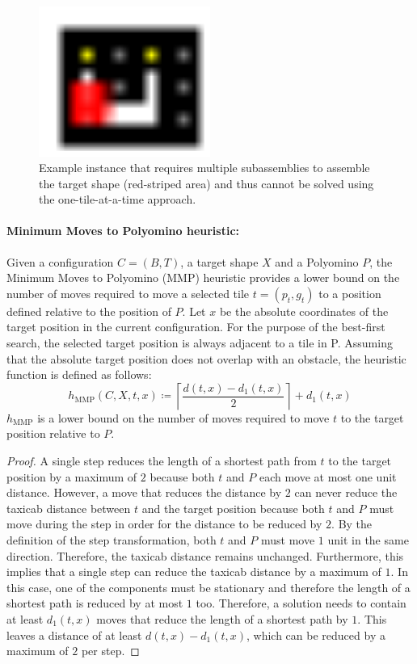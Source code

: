 \begin{figure}
\centering
\includegraphics[width=0.5\textwidth]{figures/subassemblies.pdf}
\caption[Example of necessary subassemblies]{Example instance that requires multiple subassemblies to assemble the target shape (red-striped area) and thus cannot be solved using the one-tile-at-a-time approach.}
\label{fig:subassemblies}
\end{figure}

\paragraph{Minimum Moves to Polyomino heuristic:}
Given a configuration $C = (B, T)$, a target shape $X$ and a Polyomino $P$, the Minimum Moves to Polyomino (MMP) heuristic provides a lower bound on the number of moves required to move a selected tile $t= (p_t, g_t)$ to a position defined relative to the position of $P$. Let $x$ be the absolute coordinates of the target position in the current configuration. For the purpose of the best-first search, the selected target position is always adjacent to a tile in P. Assuming that the absolute target position does not overlap with an obstacle, the heuristic function is defined as follows:
\begin{equation}
h_{\text{MMP}}(C, X, t, x) \coloneqq \left\lceil \dfrac {d(t, x) - d_{1}(t, x)}{2} \right\rceil+ d_{1} (t, x)
\end{equation}
$h_{\text{MMP}}$ is a lower bound on the number of moves required to move $t$ to the target position relative to $P$.

\begin{proof}
A single step reduces the length of a shortest path from $t$ to the target position by a maximum of $2$ because both $t$ and $P$ each move at most one unit distance. However, a move that reduces the distance by $2$ can never reduce the taxicab distance between $t$ and the target position because both $t$ and $P$ must move during the step in order for the distance to be reduced by $2$. By the definition of the step transformation, both $t$ and $P$ must move $1$ unit in the same direction. Therefore, the taxicab distance remains unchanged.
Furthermore, this implies that a single step can reduce the taxicab distance by a maximum of $1$. In this case, one of the components must be stationary and therefore the length of a shortest path is reduced by at most $1$ too. Therefore, a solution needs to contain at least $d_{1} (t, x)$ moves that reduce the length of a shortest path by $1$. This leaves a distance of at least $d(t, x) - d_{1} (t, x)$, which can be reduced by a maximum of $2$ per step.
\end{proof}


